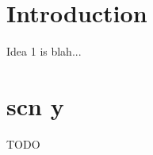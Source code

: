 \documentclass[12pt,a4paper]{article}
\begin{document}

\section*{Introduction}

Idea 1 is blah...

\section*{scn y}

TODO
\end{document}
